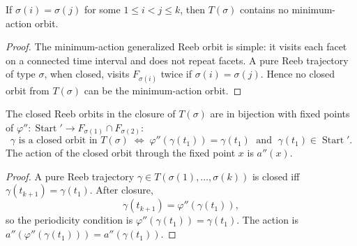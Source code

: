 \begin{unverified}
\begin{lemma}\label{lem:prune-simple}
If $\sigma(i) = \sigma(j)$ for some $1 \leq i < j \leq k$,
then $T(\sigma)$ contains no minimum-action orbit.
\end{lemma}

\begin{proof}
The minimum-action generalized Reeb orbit is simple:
it visits each facet on a connected time interval and does not repeat facets.
A pure Reeb trajectory of type $\sigma$, when closed,
visits $F_{\sigma(i)}$ twice if $\sigma(i) = \sigma(j)$.
Hence no closed orbit from $T(\sigma)$ can be the minimum-action orbit.
\end{proof}
\end{unverified}


\begin{unverified}
\begin{lemma}\label{lem:fixed-point}
The closed Reeb orbits in the closure of $T(\sigma)$ are in bijection with
fixed points of $\varphi'' \colon \operatorname{Start}' \to F_{\sigma(1)} \cap F_{\sigma(2)}$:
\[
  \gamma \text{ is a closed orbit in } T(\sigma)
  \;\Longleftrightarrow\;
  \varphi''(\gamma(t_1)) = \gamma(t_1)
  \;\text{ and }\;
  \gamma(t_1) \in \operatorname{Start}'.
\]
The action of the closed orbit through the fixed point $x$ is $a''(x)$.
\end{lemma}

\begin{proof}
A pure Reeb trajectory $\gamma \in T(\sigma(1), \ldots, \sigma(k))$
is closed iff $\gamma(t_{k+1}) = \gamma(t_1)$.
After closure,
\[
  \gamma(t_{k+1}) = \varphi''(\gamma(t_1)),
\]
so the periodicity condition is $\varphi''(\gamma(t_1)) = \gamma(t_1)$.
The action is $a''(\varphi''(\gamma(t_1))) = a''(\gamma(t_1))$.
\end{proof}
\end{unverified}


